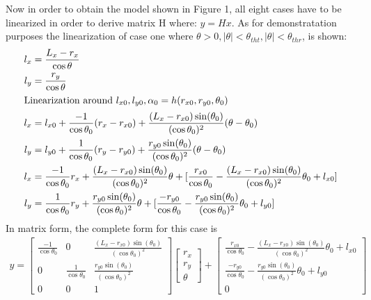 \documentclass[12pt, letterpaper]{amsart} %
\numberwithin{equation}{section}
\begin{document}
\\
\\
Now in order to obtain the model shown in Figure 1, all eight cases have to be linearized in order to derive matrix H where: $y = H x$. As for demonstratation purposes the linearization of case one where $\theta >0, |\theta| < \theta_{tht}, |\theta| < \theta_{thr}$, is shown:
\begin{align*}
  l_x &= \frac{L_x - r_x}{\cos \theta} \\
  l_y &= \frac{r_y}{\cos \theta} \\
  \intertext{Linearization around $l_{x0}, l_{y0}, \alpha_{0} = h(r_{x0}, r_{y0}, \theta_0)$}
  l_x &= l_{x0} + \frac{-1}{\cos \theta_0} (r_x - r_{x0}) + \frac{(L_x - r_{x0})\sin(\theta_0)}{(\cos{\theta_0})^2} (\theta - \theta_0) \\
  l_y &= l_{y0} + \frac{1}{\cos \theta_0}(r_y - r_{y0}) + \frac{r_{y0} \sin(\theta_0)}{(\cos \theta_0)^2} (\theta - \theta_0) \\
  l_x &= \frac{-1}{\cos \theta_0} r_x + \frac{(L_x - r_{x0})\sin(\theta_0)}{(\cos{\theta_0})^2} \theta + [\frac{r_{x0}}{\cos \theta_0} - \frac{(L_x - r_{x0})\sin(\theta_0)}{(\cos{\theta_0})^2}\theta_0 + l_{x0}] \\
  l_y &= \frac{1}{\cos \theta_0}r_y + \frac{r_{y0} \sin(\theta_0)}{(\cos \theta_0)^2} \theta + [\frac{-r_{y0}}{\cos \theta_0} - \frac{r_{y0} \sin(\theta_0)}{(\cos \theta_0)^2} \theta_0 + l_{y0}]
\end{align*}
In matrix form, the complete form for this case is
\begin{align*}
  y =
  \begin{bmatrix}
    \frac{-1}{\cos \theta_0} & 0 & \frac{(L_x - r_{x0})\sin(\theta_0)}{(\cos{\theta_0})^2} \\
    0 & \frac{1}{\cos \theta_0} & \frac{r_{y0} \sin(\theta_0)}{(\cos \theta_0)^2} \\
    0 & 0 & 1
  \end{bmatrix}
            \begin{bmatrix}
              r_x \\
              r_y \\
              \theta
            \end{bmatrix}
            +
            \begin{bmatrix}
              \frac{r_{x0}}{\cos \theta_0} - \frac{(L_x - r_{x0})\sin(\theta_0)}{(\cos{\theta_0})^2}\theta_0 + l_{x0} \\
              \frac{-r_{y0}}{\cos \theta_0} - \frac{r_{y0} \sin(\theta_0)}{(\cos \theta_0)^2} \theta_0 + l_{y0} \\
              0
            \end{bmatrix}
\end{align*}
\end{document}
